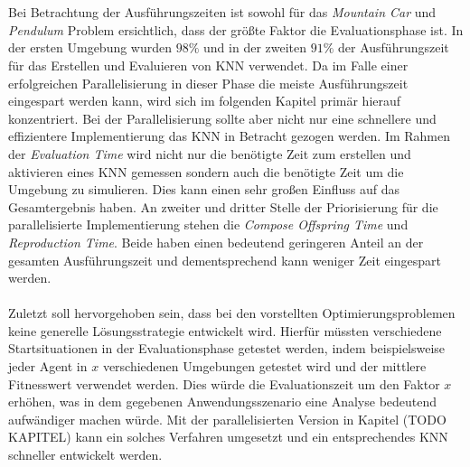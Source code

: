 \\\\
Bei Betrachtung der Ausführungszeiten ist sowohl für das \emph{Mountain Car} und \emph{Pendulum} Problem ersichtlich, dass der größte Faktor die Evaluationsphase ist. In der ersten Umgebung wurden $98\%$ und in der zweiten $91\%$ der Ausführungszeit für das Erstellen und Evaluieren von \ac{KNN} verwendet. Da im Falle einer erfolgreichen Parallelisierung in dieser Phase die meiste Ausführungszeit eingespart werden kann, wird sich im folgenden Kapitel primär hierauf konzentriert. Bei der Parallelisierung sollte aber nicht nur eine schnellere und effizientere Implementierung das \ac{KNN} in Betracht gezogen werden. Im Rahmen der \emph{Evaluation Time} wird nicht nur die benötigte Zeit zum erstellen und aktivieren eines \ac{KNN} gemessen sondern auch die benötigte Zeit um die Umgebung zu simulieren. Dies kann einen sehr großen Einfluss auf das Gesamtergebnis haben. An zweiter und dritter Stelle der Priorisierung für die parallelisierte Implementierung stehen die \emph{Compose Offspring Time} und \emph{Reproduction Time}. Beide haben einen bedeutend geringeren Anteil an der gesamten Ausführungszeit und dementsprechend kann weniger Zeit eingespart werden. 
\\\\
Zuletzt soll hervorgehoben sein, dass bei den vorstellten Optimierungsproblemen keine generelle Lösungsstrategie entwickelt wird. Hierfür müssten verschiedene Startsituationen in der Evaluationsphase getestet werden, indem beispielsweise jeder Agent in $x$ verschiedenen Umgebungen getestet wird und der mittlere Fitnesswert verwendet werden. Dies würde die Evaluationszeit um den Faktor $x$ erhöhen, was in dem gegebenen Anwendungsszenario eine Analyse bedeutend aufwändiger machen würde. Mit der parallelisierten Version in Kapitel (TODO KAPITEL) kann ein solches Verfahren umgesetzt und ein entsprechendes \ac{KNN} schneller entwickelt werden.



